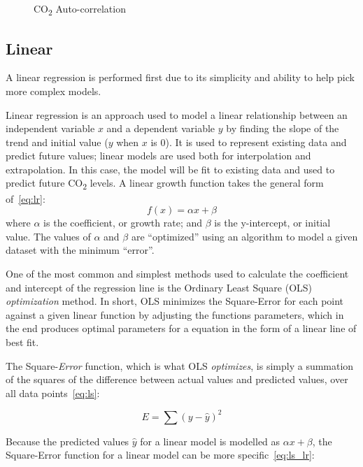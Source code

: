 \documentclass[12pt]{mcmthesis}
\begin{document}
\begin{figure}[h]
\begin{minipage}{.5\textwidth}
            \caption{CO\textsubscript{2} Auto-correlation}
            \label{fig:co2_acf}
        \end{minipage}
    \end{figure}

    \subsection{Linear}
    A linear regression is performed first due to its simplicity and ability to help pick more complex models.

    Linear regression is an approach used to model a linear relationship between an independent variable $x$ and a dependent variable $y$ by finding the slope of the trend and initial value ($y$ when $x$ is 0).
    It is used to represent existing data and predict future values; linear models are used both for interpolation and extrapolation. In this case, the model will be fit to existing data and used to predict future CO\textsubscript{2} levels.
    A linear growth function takes the general form of~\eqref{eq:lr}:
%
    \begin{equation}
        f(x) = \alpha x + \beta
        \label{eq:lr}
    \end{equation}
%
    \noindent where $\alpha$ is the coefficient, or growth rate; and $\beta$ is the y-intercept, or initial value.
    The values of $\alpha$ and $\beta$ are ``optimized'' using an algorithm to model a given dataset with the minimum ``error''.

    One of the most common and simplest methods used to calculate the coefficient and intercept of the regression line is the Ordinary Least Square (OLS) \textit{optimization} method.
    In short, OLS minimizes the Square-Error for each point against a given linear function by adjusting the function\textquotesingle s parameters, which in the end produces optimal parameters for a equation in the form of a linear line of best fit.

    The Square-\textit{Error} function, which is what OLS \textit{optimizes}, is simply a summation of the squares of the difference between actual values and predicted values, over all data points~\eqref{eq:ls}:

    \begin{equation}
        E = \sum{(y - \hat{y})^2}
        \label{eq:ls}
    \end{equation}

    Because the predicted values $\hat{y}$ for a linear model is modelled as $\alpha x + \beta$, the Square-Error function for a linear model can be more specific~\eqref{eq:ls_lr}:
\end{document}
